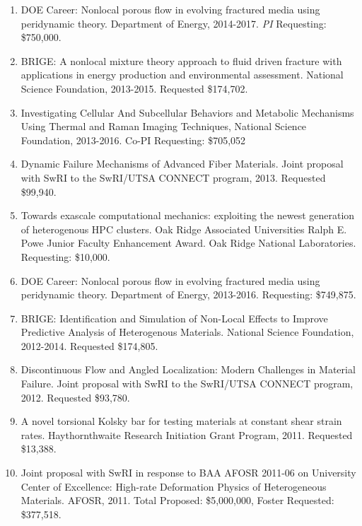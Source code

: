 \begin{enumerate}
  \item DOE Career: Nonlocal porous flow in evolving fractured media using peridynamic theory. Department of Energy, 2014-2017. \textit{PI} Requesting: \$750,000. 
    \item BRIGE: A nonlocal mixture theory approach to fluid driven fracture with applications in energy production and environmental assessment. National Science Foundation, 2013-2015. Requested \$174,702.
    \item  Investigating Cellular And Subcellular Behaviors and Metabolic Mechanisms Using Thermal and Raman Imaging Techniques, National Science Foundation, 2013-2016.  Co-PI Requesting: \$705,052
    \item Dynamic Failure Mechanisms of Advanced Fiber Materials. Joint proposal with SwRI to the SwRI/UTSA CONNECT program, 2013. Requested \$99,940.
  \item Towards exascale computational mechanics: exploiting the newest generation of heterogenous HPC clusters. Oak Ridge Associated Universities Ralph E. Powe Junior Faculty Enhancement Award. Oak Ridge National Laboratories. Requesting: \$10,000. 
    \item DOE Career: Nonlocal porous flow in evolving fractured media using peridynamic theory. Department of Energy, 2013-2016. Requesting: \$749,875. 
    \item BRIGE: Identification and Simulation of Non-Local Effects to Improve Predictive Analysis of Heterogenous Materials. National Science Foundation, 2012-2014. Requested \$174,805.
    \item Discontinuous Flow and Angled Localization: Modern Challenges in Material Failure. Joint proposal with SwRI to the SwRI/UTSA CONNECT program, 2012. Requested \$93,780.
    \item A novel torsional Kolsky bar for testing materials at constant shear strain rates. Haythornthwaite Research Initiation Grant Program, 2011. Requested \$13,388.
    \item Joint proposal with SwRI in response to BAA AFOSR 2011-06 on University Center of Excellence: High-rate Deformation Physics of Heterogeneous Materials. AFOSR, 2011. Total Proposed: \$5,000,000, Foster Requested: \$377,518.
\end{enumerate}
